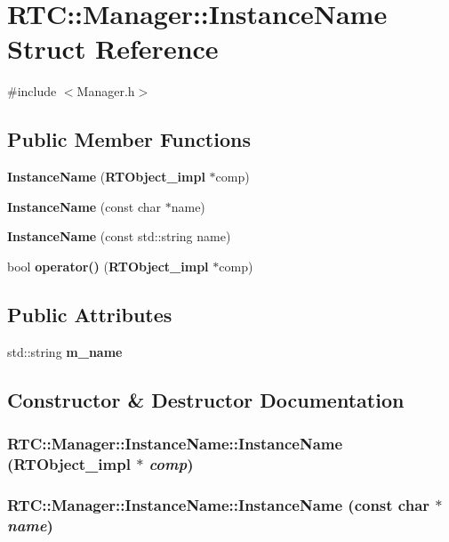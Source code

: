 \section{RTC::Manager::InstanceName Struct Reference}
\label{structRTC_1_1Manager_1_1InstanceName}


{\ttfamily \#include $<$Manager.h$>$}

\subsection*{Public Member Functions}
\begin{DoxyCompactItemize}
\item 
{\bf InstanceName} ({\bf RTObject\_\-impl} $\ast$comp)
\item 
{\bf InstanceName} (const char $\ast$name)
\item 
{\bf InstanceName} (const std::string name)
\item 
bool {\bf operator()} ({\bf RTObject\_\-impl} $\ast$comp)
\end{DoxyCompactItemize}
\subsection*{Public Attributes}
\begin{DoxyCompactItemize}
\item 
std::string {\bf m\_\-name}
\end{DoxyCompactItemize}


\subsection{Constructor \& Destructor Documentation}
\subsubsection[{InstanceName}]{\setlength{\rightskip}{0pt plus 5cm}RTC::Manager::InstanceName::InstanceName ({\bf RTObject\_\-impl} $\ast$ {\em comp})}\label{structRTC_1_1Manager_1_1InstanceName_a79521954523289d88f986d78abf73939}
\subsubsection[{InstanceName}]{\setlength{\rightskip}{0pt plus 5cm}RTC::Manager::InstanceName::InstanceName (const char $\ast$ {\em name})}\label{structRTC_1_1Manager_1_1InstanceName_a7317d4881eff0b19d18f918c2252ba44}
